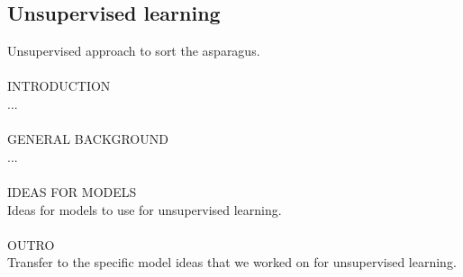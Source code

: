 \subsection{Unsupervised learning}

Unsupervised approach to sort the asparagus. \\
\\
INTRODUCTION \\
... \\
\\
GENERAL BACKGROUND \\
... \\
\\
IDEAS FOR MODELS \\
Ideas for models to use for unsupervised learning. \\
\\
OUTRO \\
Transfer to the specific model ideas that we worked on for unsupervised learning. \\
\\
